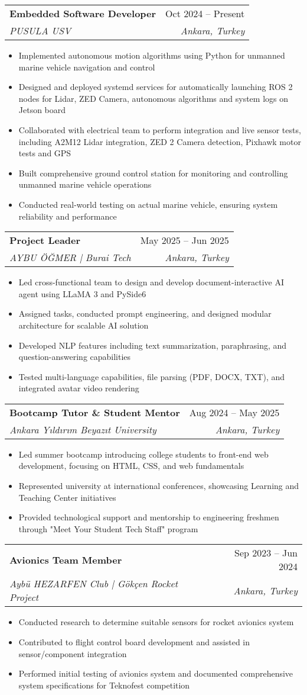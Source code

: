 \documentclass[letterpaper,11pt]{article}
\makeatletter
\newcommand{\resumeItem}[1]{
  \item\small{
    {#1 \vspace{-2pt}}
  }
}
\newcommand{\resumeSubheading}[4]{
  \vspace{-2pt}\item
    \begin{tabular*}{0.97\textwidth}[t]{l@{\extracolsep{\fill}}r}
      \textbf{#1} & #2 \\
      \textit{\small#3} & \textit{\small #4} \\
    \end{tabular*}\vspace{-7pt}
}
\newcommand{\resumeItemListStart}{\begin{itemize}}
\newcommand{\resumeItemListEnd}{\end{itemize}\vspace{-5pt}}
\makeatother
\begin{document}
    \resumeSubheading
      {Embedded Software Developer}{Oct 2024 -- Present}
      {PUSULA USV}{Ankara, Turkey}
      \resumeItemListStart
        \resumeItem{Implemented autonomous motion algorithms using Python for unmanned marine vehicle navigation and control}
        \resumeItem{Designed and deployed systemd services for automatically launching ROS 2 nodes for Lidar, ZED Camera, autonomous algorithms and system logs on Jetson board}
        \resumeItem{Collaborated with electrical team to perform integration and live sensor tests, including A2M12 Lidar integration, ZED 2 Camera detection, Pixhawk motor tests and GPS}
        \resumeItem{Built comprehensive ground control station for monitoring and controlling unmanned marine vehicle operations}
        \resumeItem{Conducted real-world testing on actual marine vehicle, ensuring system reliability and performance}
      \resumeItemListEnd

    \resumeSubheading
      {Project Leader}{May 2025 -- Jun 2025}
      {AYBU ÖĞMER | Burai Tech}{Ankara, Turkey}
      \resumeItemListStart
        \resumeItem{Led cross-functional team to design and develop document-interactive AI agent using LLaMA 3 and PySide6}
        \resumeItem{Assigned tasks, conducted prompt engineering, and designed modular architecture for scalable AI solution}
        \resumeItem{Developed NLP features including text summarization, paraphrasing, and question-answering capabilities}
        \resumeItem{Tested multi-language capabilities, file parsing (PDF, DOCX, TXT), and integrated avatar video rendering}
      \resumeItemListEnd

    \resumeSubheading
      {Bootcamp Tutor \& Student Mentor}{Aug 2024 -- May 2025}
      {Ankara Yıldırım Beyazıt University}{Ankara, Turkey}
      \resumeItemListStart
        \resumeItem{Led summer bootcamp introducing college students to front-end web development, focusing on HTML, CSS, and web fundamentals}
        \resumeItem{Represented university at international conferences, showcasing Learning and Teaching Center initiatives}
        \resumeItem{Provided technological support and mentorship to engineering freshmen through "Meet Your Student Tech Staff" program}
      \resumeItemListEnd

    \resumeSubheading
      {Avionics Team Member}{Sep 2023 -- Jun 2024}
      {Aybü HEZARFEN Club | Gökçen Rocket Project}{Ankara, Turkey}
      \resumeItemListStart
        \resumeItem{Conducted research to determine suitable sensors for rocket avionics system}
        \resumeItem{Contributed to flight control board development and assisted in sensor/component integration}
        \resumeItem{Performed initial testing of avionics system and documented comprehensive system specifications for Teknofest competition}
      \resumeItemListEnd
\end{document}
